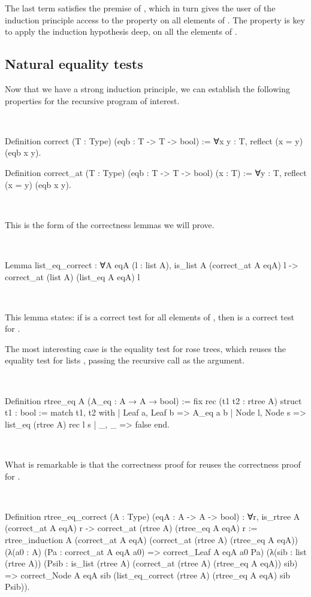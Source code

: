 \documentclass[a4paper, 11pt]{book}
\newenvironment{rocqcode}
  {\VerbatimEnvironment~\\\begin{rocqbox}\begin{xrocqcode}}{\end{xrocqcode}
\end{rocqbox}\\}
\begin{document}
The last term satisfies the premise of , which in turn gives
the user of the induction principle access to the property  on all
elements of . The  property is
key to apply the induction hypothesis  deep, on all the elements
of . 

\subsection{Natural equality tests}


Now that we have a strong induction principle, we can establish the following
properties for the recursive program of interest.

\begin{rocqcode}
Definition correct (T : Type) (eqb : T -> T -> bool) :=
  ∀x y : T, reflect (x = y) (eqb x y).

Definition correct_at (T : Type) (eqb : T -> T -> bool) (x : T) :=
  ∀y : T, reflect (x = y) (eqb x y).
\end{rocqcode}

\noindent
This is the form of the correctness lemmas we will prove.

\begin{rocqcode}
Lemma list_eq_correct : ∀A eqA (l : list A),
  is_list A (correct_at A eqA) l ->
    correct_at (list A) (list_eq A eqA) l
\end{rocqcode}

\noindent
This lemma states: if  is a correct test for all elements of
, then  is a correct test for .

The most interesting case is the equality test for rose trees, which reuses
the equality test for lists , passing the recursive call as the
 argument.

\begin{rocqcode}
Definition rtree_eq A (A_eq : A → A → bool) :=
  fix rec (t1 t2 : rtree A) {struct t1} : bool :=
    match t1, t2 with
    | Leaf a, Leaf b => A_eq a b
    | Node l, Node s => list_eq (rtree A) rec l s
    | _, _ => false
    end.
\end{rocqcode}

\noindent
What is remarkable is that the correctness proof for 
reuses the correctness proof for .

\begin{rocqcode}
Definition rtree_eq_correct (A : Type) (eqA : A -> A -> bool) :
  ∀r, is_rtree A (correct_at A eqA) r ->
        correct_at (rtree A) (rtree_eq A eqA) r
:=
  rtree_induction
    A (correct_at A eqA) (correct_at (rtree A) (rtree_eq A eqA))
    (λ(a0 : A) (Pa : correct_at A eqA a0) =>
       correct_Leaf A eqA a0 Pa)
    (λ(sib : list (rtree A))
         (Psib : is_list (rtree A)
                   (correct_at (rtree A) (rtree_eq A eqA)) sib) =>
       correct_Node A eqA sib
         (list_eq_correct (rtree A) (rtree_eq A eqA) sib Psib)).
\end{rocqcode}
\end{document}
